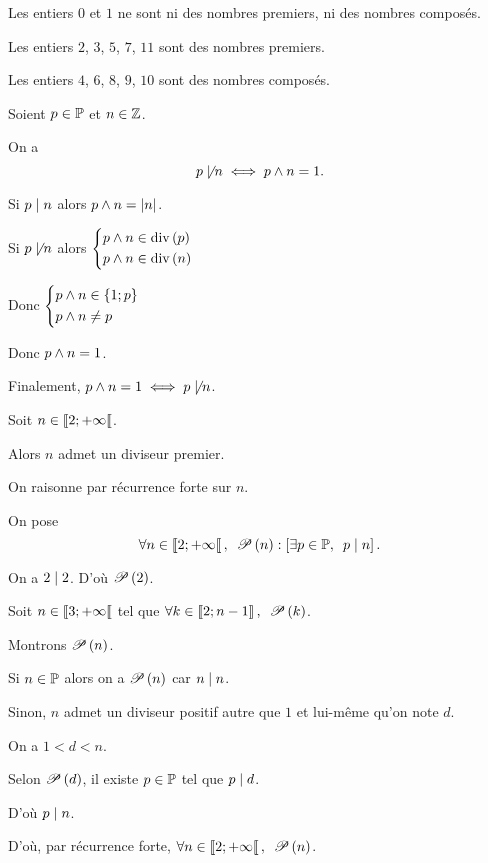 \begin{ex}
Les entiers \(0\) et \(1\) ne sont ni des nombres premiers, ni des nombres composés.

Les entiers \(2\), \(3\), \(5\), \(7\), \(11\) sont des nombres premiers.

Les entiers \(4\), \(6\), \(8\), \(9\), \(10\) sont des nombres composés.
\end{ex}

\begin{rem}
Soient \(p\in\prem\) et \(n\in\Z\).

On a \[p\not\divise n\ssi p\et n=1.\]
\end{rem}

\begin{dem}
Si \(p\divise n\) alors \(p\et n=\abs{n}\).

Si \(p\not\divise n\) alors \(\begin{dcases}p\et n\in\ensdiv{p} \\ p\et n\in\ensdiv{n}\end{dcases}\)

Donc \(\begin{dcases}p\et n\in\accol{1;p} \\ p\et n\not=p\end{dcases}\)

Donc \(p\et n=1\).

Finalement, \(p\et n=1\ssi p\not\divise n\).
\end{dem}

\begin{lem}
Soit \(n\in\interventierie{2}{\pinf}\).

Alors \(n\) admet un diviseur premier.
\end{lem}

\begin{dem}
On raisonne par récurrence forte sur \(n\).

On pose \[\quantifs{\forall n\in\interventierie{2}{\pinf}}\P{n}:\croch{\quantifs{\exists p\in\prem}p\divise n}.\]

On a \(2\divise 2\). D'où \(\P{2}\).

Soit \(n\in\interventierie{3}{\pinf}\) tel que \(\quantifs{\forall k\in\interventierii{2}{n-1}}\P{k}\).

Montrons \(\P{n}\).

Si \(n\in\prem\) alors on a \(\P{n}\) car \(n\divise n\).

Sinon, \(n\) admet un diviseur positif autre que \(1\) et lui-même qu'on note \(d\).

On a \(1<d<n\).

Selon \(\P{d}\), il existe \(p\in\prem\) tel que \(p\divise d\).

D'où \(p\divise n\).

D'où, par récurrence forte, \(\quantifs{\forall n\in\interventierie{2}{\pinf}}\P{n}\).
\end{dem}

